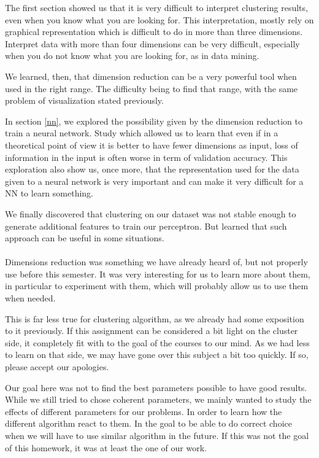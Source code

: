 \documentclass[twocolumn,a4paper,10pt]{article}
\begin{document}
The first section showed us that it is very difficult to interpret
clustering results, even when you know what you are looking for. This
interpretation, mostly rely on graphical representation which is difficult
to do in more than three dimensions. Interpret data with more than
four dimensions can be very difficult, especially when you do not
know what you are looking for, as in data mining.

We learned, then, that dimension reduction can be a very powerful
tool when used in the right range. The difficulty being to find that
range, with the same problem of visualization stated previously.

In section \ref{nn}, we explored the possibility given by the dimension
reduction to train a neural network. Study which allowed us to learn
that even if in a theoretical point of view it is better to have fewer
dimensions as input, loss of information in the input is often worse
in term of validation accuracy. This exploration also show us, once
more, that the representation used for the data given to a neural
network is very important and can make it very difficult for a NN
to learn something.

We finally discovered that clustering on our dataset was not stable
enough to generate additional features to train our perceptron. But
learned that such approach can be useful in some situations.

\paragraph{}

Dimensions reduction was something we have already heard of, but not
properly use before this semester. It was very interesting for us
to learn more about them, in particular to experiment with them, which
will probably allow us to use them when needed.

This is far less true for clustering algorithm, as we already had
some exposition to it previously. If this assignment can be considered
a bit light on the cluster side, it completely fit with to the goal
of the courses to our mind. As we had less to learn on that side,
we may have gone over this subject a bit too quickly. If so, please
accept our apologies.

Our goal here was not to find the best parameters possible to have
good results. While we still tried to chose coherent parameters, we
mainly wanted to study the effects of different parameters for our
problems. In order to learn how the different algorithm react to them.
In the goal to be able to do correct choice when we will have to use
similar algorithm in the future. If this was not the goal of this
homework, it was at least the one of our work.
\end{document}
